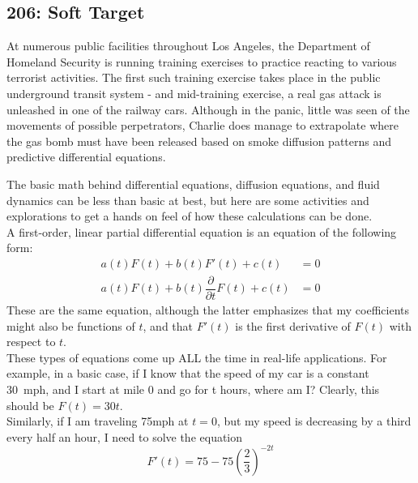 \newpage
\subsection{206: Soft Target\label{206}}

At numerous public facilities throughout Los Angeles, the Department of Homeland Security is running training exercises to practice reacting to various terrorist activities. The first such training exercise takes place in the public underground transit system - and mid-training exercise, a real gas attack is unleashed in one of the railway cars. Although in the panic, little was seen of the movements of possible perpetrators, Charlie does manage to extrapolate where the gas bomb must have been released based on smoke diffusion patterns and predictive differential equations. \\


The basic math behind differential equations, diffusion equations, and fluid dynamics can be less than basic at best, but here are some activities and explorations to get a hands on feel of how these calculations can be done. \\

A first-order, linear partial differential equation is an equation of the following form:  
	\[
	\begin{split}
	a(t) F(t) + b(t) F'(t) + c(t) &=0 \\
	a(t) F(t) + b(t) \dfrac{\partial}{\partial t} F(t) + c(t) &=0
	\end{split}
	\]
These are the same equation, although the latter emphasizes that my coefficients might also be functions of $t$, and that $F'(t)$ is the first derivative of $F(t)$ with respect to $t$. \\

These types of equations come up ALL the time in real-life applications. For example, in a basic case, if I know that the speed of my car is a constant 30~mph, and I start at mile 0 and go for t hours, where am I? Clearly, this should be $F(t)=30t$. \\

Similarly, if I am traveling 75mph at $t=0$, but my speed is decreasing by a third every half an hour, I need to solve the equation
	\[
	F'(t)= 75 - 75 \left(\frac{2}{3}\right)^{-2t}
	\]

